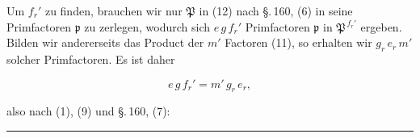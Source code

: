
Um $f_r'$ zu finden, brauchen wir nur $\mathfrak{P}$ in (12) nach \S.\,160, (6)
in seine Primfactoren $\mathfrak{p}$ zu zerlegen, wodurch sich $e\,g\,f_r'$ Primfactoren
 $\mathfrak{p}$ in $\mathfrak{P}^{\,f_r'}$ ergeben. Bilden wir andererseits das Product
der $m'$ Factoren (11), so erhalten wir $g_r\,e_r\,m'$ solcher Primfactoren.
Es ist daher

\[
e\,g\,f_r' = m'\,g_r\,e_r,
\]

also nach (1), (9) und \S.\,160, (7):


\begin{center}
\rule{0.3\linewidth}{0.4pt}
\end{center}
